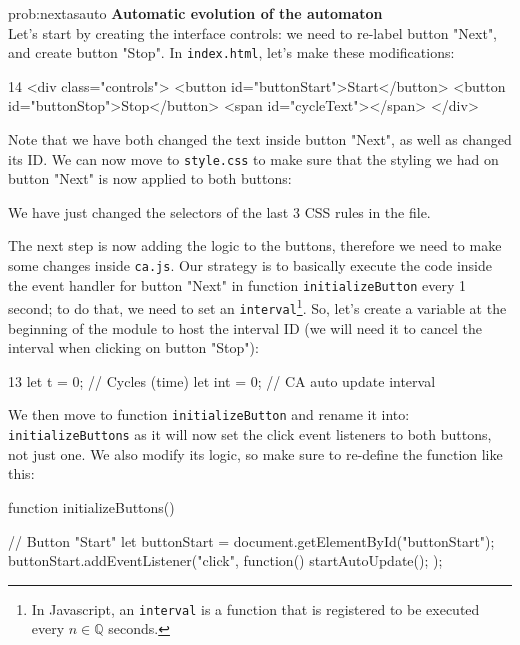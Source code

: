 \begin{sol}{prob:nextasauto}
\textbf{Automatic evolution of the automaton}\\
Let's start by creating the interface controls: we need to re-label button "Next", and create button "Stop".
In \texttt{index.html}, let's make these modifications:
\begin{codehtmlh1}{1}{4}
<div class="controls">
  <button id="buttonStart">Start</button>
  <button id="buttonStop">Stop</button>
  <span id="cycleText"></span>
</div>
\end{codehtmlh1}
Note that we have both changed the text inside button "Next", as well as changed its ID.
We can now move to \texttt{style.css} to make sure that the styling we had on button "Next" is now
applied to both buttons:
We have just changed the selectors of the last 3 CSS rules in the file.

The next step is now adding the logic to the buttons, therefore we need to make some changes inside
\texttt{ca.js}. Our strategy is to basically execute the code inside the event handler for button "Next" in
function \texttt{initializeButton} every 1 second; to do that, we need to set an
\texttt{interval}\footnote{In Javascript, an \texttt{interval} is a function that is registered to be
executed every $n \in \mathbb{Q}$ seconds.}. So, let's create a variable at the beginning of the module to
host the interval ID (we will need it to cancel the interval when clicking on button "Stop"):
\begin{codeh1}{1}{3}
let t = 0; // Cycles (time)
let int = 0; // CA auto update interval
\end{codeh1}
We then move to function \texttt{initializeButton} and rename it into: \texttt{initializeButtons} as it will now
set the click event listeners to both buttons, not just one. We also modify its logic, so make sure
to re-define the function like this:
\begin{code}
function initializeButtons() {
  // Button "Start"
  let buttonStart = document.getElementById("buttonStart");
  buttonStart.addEventListener("click", function(){
    startAutoUpdate();
  });

}
\end{code}
\end{sol}
